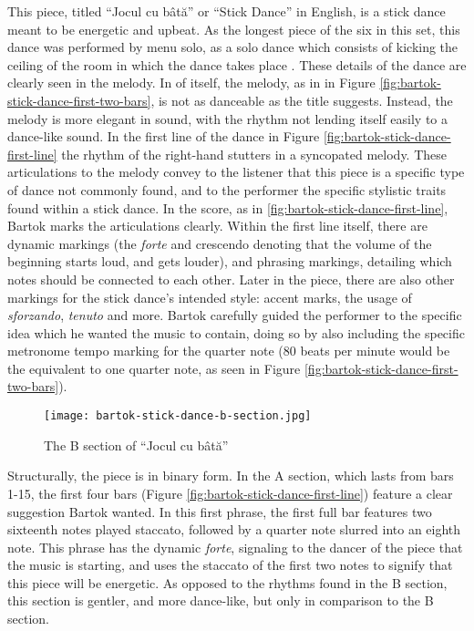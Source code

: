 This piece, titled ``Jocul cu bâtă'' or ``Stick Dance'' in English, is a stick dance meant to be energetic and upbeat. As the longest piece of the six in this set, this dance was performed by menu solo, as a solo dance which consists of kicking the ceiling of the room in which the dance takes place \autocite{Weissmann_1969}. These details of the dance are clearly seen in the melody. In of itself, the melody, as in  in Figure \ref{fig:bartok-stick-dance-first-two-bars}\autocite{Lung_2016}, is not as danceable as the title suggests. Instead, the melody is more elegant in sound, with the rhythm not lending itself easily to a dance-like sound. In the first line of the dance in Figure \ref{fig:bartok-stick-dance-first-line}\autocite{Lung_2016} the rhythm of the right-hand stutters in a syncopated melody. These articulations to the melody convey to the listener that this piece is a specific type of dance not commonly found, and to the performer the specific stylistic traits found within a stick dance. In the score, as in \ref{fig:bartok-stick-dance-first-line}\autocite{Lung_2016}, Bartok marks the articulations clearly. Within the first line itself, there are dynamic markings (the \textit{forte} and crescendo denoting that the volume of the beginning starts loud, and gets louder), and phrasing markings, detailing which notes should be connected to each other. Later in the piece, there are also other markings for the stick dance's intended style: accent marks, the usage of \textit{sforzando}, \textit{tenuto} and more. Bartok carefully guided the performer to the specific idea which he wanted the music to contain, doing so by also including the specific metronome tempo marking for the quarter note (80 beats per minute would be the equivalent to one quarter note, as seen in Figure \ref{fig:bartok-stick-dance-first-two-bars}\autocite{Lung_2016}).

\begin{figure}
  \centering
  \texttt{[image: bartok-stick-dance-b-section.jpg]}
  \caption[The B Section, of ``Jocul cu bâtă'' in Bartok's \textit{Romanian Folk Dances, Sz. 56, BB 68}]{The B section of ``Jocul cu bâtă''}
  \label{fig:bartok-b-section}
\end{figure}


Structurally, the piece is in binary form. In the A section, which lasts from bars 1-15, the first four bars (Figure \ref{fig:bartok-stick-dance-first-line}\autocite{Lung_2016}) feature a clear suggestion Bartok wanted. In this first phrase, the first full bar features two sixteenth notes played staccato, followed by a quarter note slurred into an eighth note. This phrase has the dynamic \textit{forte}, signaling to the dancer of the piece that the music is starting, and uses the staccato of the first two notes to signify that this piece will be energetic. As opposed to the rhythms found in the B section, this section is gentler, and more dance-like, but only in comparison to the B section. 

